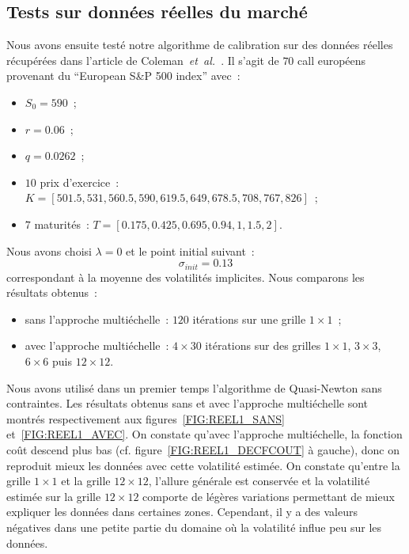 \clearpage
\pagebreak

\subsection{Tests sur donn\'ees r\'eelles du march\'e}

Nous avons ensuite test\'e notre algorithme de calibration 
sur des donn\'ees r\'eelles r\'ecup\'er\'ees dans l'article 
de Coleman~{\em et~al.}~\cite{col:jcf:99}. Il s'agit de $70$ call 
europ\'eens provenant du ``European S\&P 500 index'' avec~:
\begin{itemize}
\item
$S_0 = 590$~;
\item
$r = 0.06$~;
\item
$q = 0.0262$~;
\item
$10$ prix d'exercice~: 
$K = [501.5,531,560.5,590,619.5,649,678.5,708,767,826]$~;
\item
$7$ maturit\'es~: $T = [0.175,0.425,0.695,0.94,1,1.5,2]$.
\end{itemize}

Nous avons choisi $\lambda = 0$ et le point initial suivant~:
$$
\sigma_{init} = 0.13
$$
correspondant \`a la moyenne des volatilit\'es implicites. 
Nous comparons les r\'esultats obtenus~:
\begin{itemize}
\item
sans l'approche multi\'echelle~: $120$ it\'erations sur une 
grille $1 \times 1$~;
\item
avec l'approche multi\'echelle~: $4 \times 30$ it\'erations 
sur des grilles $1 \times 1$, $3 \times 3$, $6 \times 6$ puis 
$12 \times 12$.
\end{itemize}

Nous avons utilis\'e dans un premier temps l'algorithme de 
Quasi-Newton sans contraintes. Les r\'esultats obtenus sans et 
avec l'approche multi\'echelle sont montr\'es respectivement aux 
figures~\ref{FIG:REEL1_SANS} et~\ref{FIG:REEL1_AVEC}. On constate 
qu'avec l'approche multi\'echelle, la fonction co\^ut descend plus 
bas (cf. figure~\ref{FIG:REEL1_DECFCOUT} \`a gauche), donc on 
reproduit mieux les donn\'ees avec cette volatilit\'e estim\'ee. 
On constate qu'entre la grille $1 \times 1$ et la grille 
$12 \times 12$, l'allure g\'en\'erale est conserv\'ee et la 
volatilit\'e estim\'ee sur la grille $12 \times 12$ comporte de 
l\'eg\`eres variations permettant de mieux expliquer les donn\'ees 
dans certaines zones. Cependant, il y a des valeurs n\'egatives 
dans une petite partie du domaine o\`u la volatilit\'e influe 
peu sur les donn\'ees.

